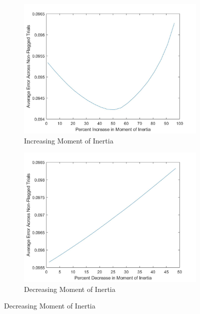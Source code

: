 \documentclass{article}
\begin{document}
\begin{figure}[ht]
    \caption{Varying Moment of Inertia}
    \centering
    \begin{subfigure}[b]{0.45\linewidth}
        \includegraphics[scale=0.12]{incMOI.jpg}
        \caption{Increasing Moment of Inertia}
        \label{fig:incMOI}
    \end{subfigure}
    \quad
    \begin{subfigure}[b]{0.45\linewidth}
       \includegraphics[scale=0.12]{decMOI.jpg}
        \caption{Decreasing Moment of Inertia}
        \label{fig:decMOI}
    \end{subfigure}
\end{figure}
\end{document}
